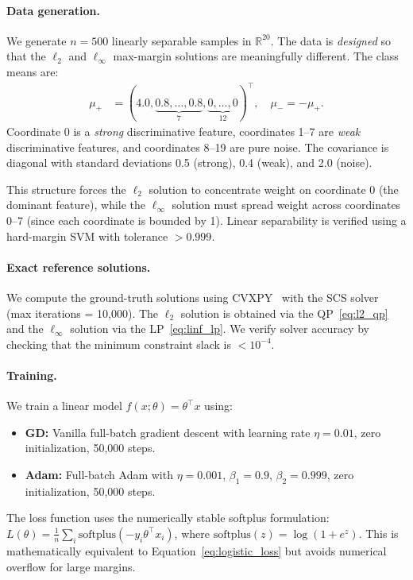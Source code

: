 \documentclass{article}
\begin{document}
\paragraph{Data generation.} We generate $n = 500$ linearly separable samples in $\mathbb{R}^{20}$. The data is \emph{designed} so that the $\ell_2$ and $\ell_\infty$ max-margin solutions are meaningfully different. The class means are:
\begin{align}
    \mu_{+} &= (4.0, \underbrace{0.8, \ldots, 0.8}_{7}, \underbrace{0, \ldots, 0}_{12})^\top, \quad \mu_{-} = -\mu_{+}.
\end{align}
Coordinate 0 is a \emph{strong} discriminative feature, coordinates 1--7 are \emph{weak} discriminative features, and coordinates 8--19 are pure noise. The covariance is diagonal with standard deviations 0.5 (strong), 0.4 (weak), and 2.0 (noise).

This structure forces the $\ell_2$ solution to concentrate weight on coordinate 0 (the dominant feature), while the $\ell_\infty$ solution must spread weight across coordinates 0--7 (since each coordinate is bounded by 1). Linear separability is verified using a hard-margin SVM with tolerance $>0.999$.

\paragraph{Exact reference solutions.} We compute the ground-truth solutions using CVXPY~\cite{cvxpy} with the SCS solver (max iterations = 10,000). The $\ell_2$ solution is obtained via the QP~\eqref{eq:l2_qp} and the $\ell_\infty$ solution via the LP~\eqref{eq:linf_lp}. We verify solver accuracy by checking that the minimum constraint slack is $< 10^{-4}$.

\paragraph{Training.} We train a linear model $f(x; \theta) = \theta^\top x$ using:
\begin{itemize}[leftmargin=*]
    \item \textbf{GD:} Vanilla full-batch gradient descent with learning rate $\eta = 0.01$, zero initialization, 50,000 steps.
    \item \textbf{Adam:} Full-batch Adam with $\eta = 0.001$, $\beta_1 = 0.9$, $\beta_2 = 0.999$, zero initialization, 50,000 steps.
\end{itemize}

The loss function uses the numerically stable softplus formulation: $L(\theta) = \frac{1}{n}\sum_i \text{softplus}(-y_i \theta^\top x_i)$, where $\text{softplus}(z) = \log(1 + e^z)$. This is mathematically equivalent to Equation~\eqref{eq:logistic_loss} but avoids numerical overflow for large margins.
\end{document}
